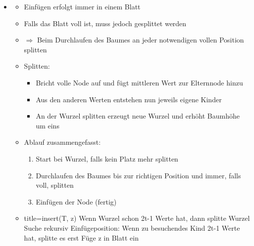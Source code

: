 \documentclass[
    12pt,
    a4paper,
    ngerman,
    color=3b,%
    marginpar=false,
    colorback=false,
    leqno,
]{tudaexercise}
\begin{document}
\begin{itemize}
        \item {}
            \begin{itemize}
                \item Einfügen erfolgt immer in einem Blatt
                \item Falls das Blatt voll ist, muss jedoch gesplittet werden
                \item $\Rightarrow$ Beim Durchlaufen des Baumes an jeder notwendigen vollen Position splitten
                \item Splitten:
                    \begin{itemize}
                        \item Bricht volle Node auf und fügt mittleren Wert zur Elternnode hinzu
                        \item Aus den anderen Werten entstehen nun jeweils eigene Kinder
                        \item An der Wurzel splitten erzeugt neue Wurzel und erhöht Baumhöhe um eins
                    \end{itemize}
                \item Ablauf zusammengefasst:
                    \begin{enumerate}
                        \item Start bei Wurzel, falls kein Platz mehr splitten
                        \item Durchlaufen des Baumes bis zur richtigen Position und immer, falls voll, splitten
                        \item Einfügen der Node (fertig)
                    \end{enumerate}
                \item[]
                    \begin{ccode}[autogobble]{title={insert(T, z)}}
                    Wenn Wurzel schon 2t-1 Werte hat, dann splitte Wurzel
                    Suche rekursiv Einfügeposition:
                        Wenn zu besuchendes Kind 2t-1 Werte hat, splitte es erst
                    Füge z in Blatt ein
                    \end{ccode}
            \end{itemize}

\clearpage


\end{itemize}
\end{document}

